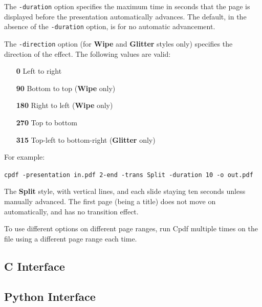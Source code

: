 \documentclass{book}
\begin{document}
The \texttt{-duration} option specifies the maximum time in seconds that the
page is displayed before the presentation automatically advances. The default,
in the absence of the \texttt{-duration} option, is for no automatic
advancement.

The \texttt{-direction} option (for \textbf{Wipe} and \textbf{Glitter} styles
only) specifies the direction of the effect. The following values are valid:
\begin{itemize}
  \item[\textbf{0}] Left to right
  \item[\textbf{90}] Bottom to top (\textbf{Wipe} only)
  \item[\textbf{180}] Right to left (\textbf{Wipe} only)
  \item[\textbf{270}] Top to bottom
  \item[\textbf{315}] Top-left to bottom-right (\textbf{Glitter} only)
\end{itemize}

\noindent For example:

\begin{framed}
  \small
  \noindent\verb!cpdf -presentation in.pdf 2-end -trans Split -duration 10 -o out.pdf!

  \vspace{2.5mm}
  \noindent The \textbf{Split} style, with vertical lines, and each slide staying ten
seconds unless manually advanced. The first page (being a title) does not move
on automatically, and has no transition effect.

\end{framed}

\noindent To use different options on different page ranges, run Cpdf multiple times on
the file using a different page range each time.

\begin{cpdflib}
\clearpage
\section*{C Interface}
\begin{small}\tt

\end{small}
\end{cpdflib}

\begin{pycpdflib}
\clearpage
\section*{Python Interface}
\begin{small}\tt

\end{small}
\end{pycpdflib}
\end{document}
